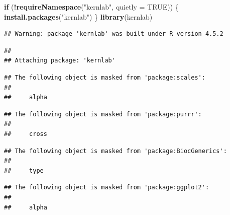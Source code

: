 \documentclass[
]{article}
\newenvironment{Shaded}{\begin{snugshade}}{\end{snugshade}}
\newcommand{\AttributeTok}[1]{\textcolor[rgb]{0.13,0.29,0.53}{#1}}
\newcommand{\ConstantTok}[1]{\textcolor[rgb]{0.56,0.35,0.01}{#1}}
\newcommand{\ControlFlowTok}[1]{\textcolor[rgb]{0.13,0.29,0.53}{\textbf{#1}}}
\newcommand{\FunctionTok}[1]{\textcolor[rgb]{0.13,0.29,0.53}{\textbf{#1}}}
\newcommand{\NormalTok}[1]{#1}
\newcommand{\SpecialCharTok}[1]{\textcolor[rgb]{0.81,0.36,0.00}{\textbf{#1}}}
\newcommand{\StringTok}[1]{\textcolor[rgb]{0.31,0.60,0.02}{#1}}
\begin{document}
\begin{Shaded}
\begin{Highlighting}[]
\ControlFlowTok{if}\NormalTok{ (}\SpecialCharTok{!}\FunctionTok{requireNamespace}\NormalTok{(}\StringTok{"kernlab"}\NormalTok{, }\AttributeTok{quietly =} \ConstantTok{TRUE}\NormalTok{)) \{}
  \FunctionTok{install.packages}\NormalTok{(}\StringTok{"kernlab"}\NormalTok{)}
\NormalTok{\}}
\FunctionTok{library}\NormalTok{(kernlab)}
\end{Highlighting}
\end{Shaded}

\begin{verbatim}
## Warning: package 'kernlab' was built under R version 4.5.2
\end{verbatim}

\begin{verbatim}
## 
## Attaching package: 'kernlab'
\end{verbatim}

\begin{verbatim}
## The following object is masked from 'package:scales':
## 
##     alpha
\end{verbatim}

\begin{verbatim}
## The following object is masked from 'package:purrr':
## 
##     cross
\end{verbatim}

\begin{verbatim}
## The following object is masked from 'package:BiocGenerics':
## 
##     type
\end{verbatim}

\begin{verbatim}
## The following object is masked from 'package:ggplot2':
## 
##     alpha
\end{verbatim}
\end{document}
